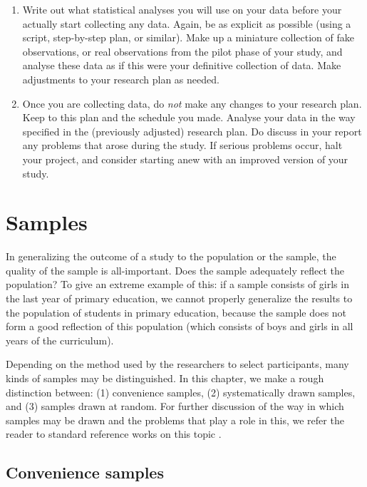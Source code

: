 \documentclass[
]{book}
\begin{document}
\begin{enumerate}
\item
  Write out what statistical analyses you will use on your data before your actually start collecting any data. Again, be as explicit as possible (using a script, step-by-step plan, or similar). Make up a miniature collection of fake observations, or real observations from the pilot phase of your study, and analyse these data as if this were your definitive collection of data. Make adjustments to your research plan as needed.
\item
  Once you are collecting data, do \emph{not} make any changes to your research plan. Keep to this plan and the schedule you made. Analyse your data in the way specified in the (previously adjusted) research plan. Do discuss in your report any problems that arose during the study. If serious problems occur, halt your project, and consider starting anew with an improved version of your study.
\end{enumerate}

\hypertarget{ch-samples}{%
\chapter{Samples}\label{ch-samples}}

In generalizing the outcome of a study to the population or the sample, the quality of the sample is all-important. Does the sample adequately reflect the population? To give an extreme example of this: if a sample consists of girls in the last year of primary education, we cannot properly generalize the results to the population of students in primary education, because the sample does not form a good reflection of this population (which consists of boys and girls in all years of the curriculum).

Depending on the method used by the researchers to select participants, many kinds of samples may be distinguished. In this chapter, we make a rough distinction between: (1) convenience samples, (2) systematically drawn samples, and (3) samples drawn at random. For further discussion of the way in which samples may be drawn and the problems that play a role in this, we refer the reader to standard reference works on this topic \citep{Coch77, Thom12}.

\hypertarget{sec:convenience-samples}{%
\section{Convenience samples}\label{sec:convenience-samples}}
\end{document}
